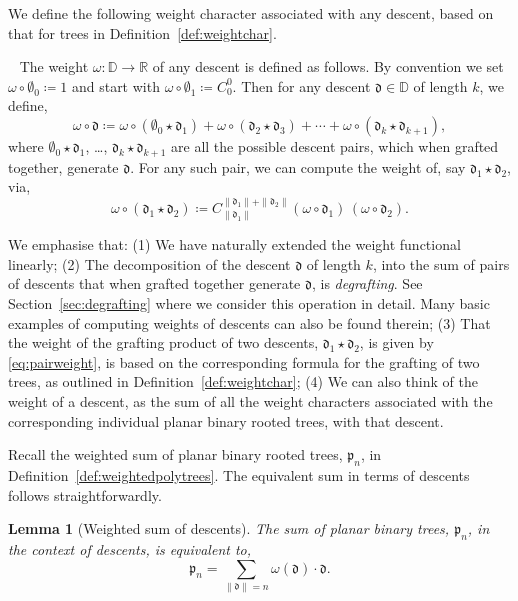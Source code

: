 \documentclass[5p,twocolumn]{elsarticle}
\newcommand*{\R}{\mathbb R}
\newcommand*{\pf}{\mathfrak p}
\newcommand*{\df}{\mathfrak d}
\newtheorem{lemma}[theorem]{Lemma}
\begin{document}
We define the following weight character associated with any descent, based on that for trees in Definition~\ref{def:weightchar}.
%
\begin{definition}~\label{def:descentweight}
  The weight $\omega\colon\mathbb D\to\R$ of any descent is defined as follows. By convention we set $\omega\circ\emptyset_0\coloneqq1$ and
  start with $\omega\circ\emptyset_1\coloneqq C^0_0$. Then for any descent $\df\in\mathbb D$ of length $k$, we define,
  \begin{equation*}
     \omega\circ\df\coloneqq\omega\circ(\emptyset_0\star\df_1)+\omega\circ(\df_2\star\df_3)+\cdots+\omega\circ(\df_{k}\star\df_{k+1}),
  \end{equation*} 
  where $\emptyset_0\star\df_1$, \ldots, $\df_{k}\star\df_{k+1}$ are all the possible descent pairs, which when grafted together, generate $\df$.
  For any such pair, we can compute the weight of, say $\df_1\star\df_2$, via,
  \begin{equation}\label{eq:pairweight}
    \omega\circ(\df_1\star\df_2)\coloneqq C^{\|\df_1\|+\|\df_2\|}_{\|\df_1\|}(\omega\circ\df_1)\,(\omega\circ\df_2).
  \end{equation}
\end{definition}
%
\begin{remark}
  We emphasise that: (1) We have naturally extended the weight functional linearly;
  (2) The decomposition of the descent $\df$ of length $k$, into the sum of pairs of descents that when grafted together generate $\df$, is \emph{degrafting}.
  See Section~\ref{sec:degrafting} where we consider this operation in detail. Many basic examples of computing weights of descents can also be found therein; 
  (3) That the weight of the grafting product of two descents, $\df_1\star\df_2$, is given by \eqref{eq:pairweight}, is based on the corresponding formula
  for the grafting of two trees, as outlined in Definition~\ref{def:weightchar};
  (4) We can also think of the weight of a descent, as the sum of all the weight characters associated with the corresponding individual planar binary rooted trees, with that descent.
\end{remark}
%
Recall the weighted sum of planar binary rooted trees, $\pf_n$, in Definition~\ref{def:weightedpolytrees}. The equivalent sum in terms of descents follows straightforwardly.
%
\begin{lemma}[Weighted sum of descents]\label{lemma:weightedsumofdescents}
  The sum of planar binary trees, $\pf_n$, in the context of descents, is equivalent to,
   \begin{equation*}
        \pf_n=\sum_{\|\df\|=n}\omega(\df)\cdot\df.
  \end{equation*}
\end{lemma}
\end{document}
